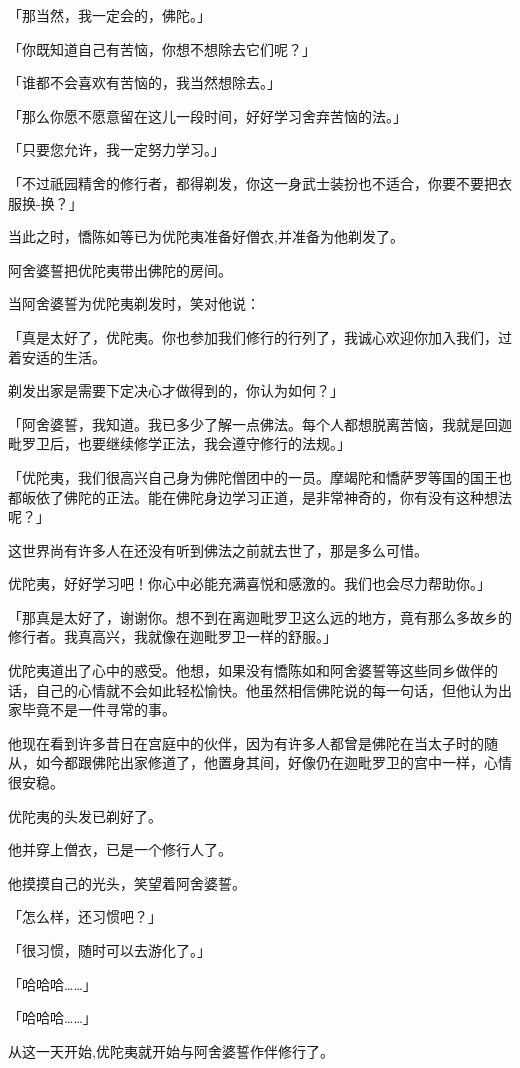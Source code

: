 \documentclass[twoside,openany]{book}
\begin{document}
「那当然，我一定会的，佛陀。」

「你既知道自己有苦恼，你想不想除去它们呢？」

「谁都不会喜欢有苦恼的，我当然想除去。」

「那么你愿不愿意留在这儿一段时间，好好学习舍弃苦恼的法。」

「只要您允许，我一定努力学习。」

「不过祇园精舍的修行者，都得剃发，你这一身武士装扮也不适合，你要不要把衣服换-换？」

当此之时，憍陈如等已为优陀夷准备好僧衣,并准备为他剃发了。

阿舍婆誓把优陀夷带出佛陀的房间。

当阿舍婆誓为优陀夷剃发时，笑对他说：

「真是太好了，优陀夷。你也参加我们修行的行列了，我诚心欢迎你加入我们，过着安适的生活。

剃发出家是需要下定决心才做得到的，你认为如何？」

「阿舍婆誓，我知道。我已多少了解一点佛法。每个人都想脱离苦恼，我就是回迦毗罗卫后，也要继续修学正法，我会遵守修行的法规。」

「优陀夷，我们很高兴自己身为佛陀僧团中的一员。摩竭陀和憍萨罗等国的国王也都皈依了佛陀的正法。能在佛陀身边学习正道，是非常神奇的，你有没有这种想法呢？」

这世界尚有许多人在还没有听到佛法之前就去世了，那是多么可惜。

优陀夷，好好学习吧！你心中必能充满喜悦和感激的。我们也会尽力帮助你。」

「那真是太好了，谢谢你。想不到在离迦毗罗卫这么远的地方，竟有那么多故乡的修行者。我真高兴，我就像在迦毗罗卫一样的舒服。」

优陀夷道出了心中的惑受。他想，如果没有憍陈如和阿舍婆誓等这些同乡做伴的话，自己的心情就不会如此轻松愉快。他虽然相信佛陀说的每一句话，但他认为出家毕竟不是一件寻常的事。

他现在看到许多昔日在宫庭中的伙伴，因为有许多人都曾是佛陀在当太子时的随从，如今都跟佛陀出家修道了，他置身其间，好像仍在迦毗罗卫的宫中一样，心情很安稳。

优陀夷的头发已剃好了。

他并穿上僧衣，已是一个修行人了。

他摸摸自己的光头，笑望着阿舍婆誓。

「怎么样，还习惯吧？」

「很习惯，随时可以去游化了。」

「哈哈哈……」

「哈哈哈……」

从这一天开始,优陀夷就开始与阿舍婆誓作伴修行了。
\end{document}
